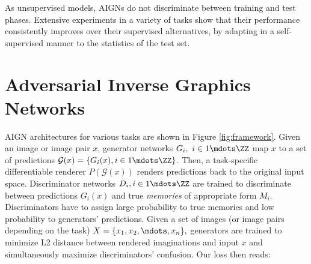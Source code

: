\documentclass[10pt,twocolumn,letterpaper]{article}
\begin{document}
\begin{bibunit}[ieee]
\begin{comment}

We test our AIGN model in the following tasks: (a) 3D human pose estimation from a single image, where it outperforms both a supervised model and the 3D interpreter model of  \cite{Wu2016} (which does not have adversarial priors). (b) Learning egomotion and 3D depth given a pair of frames (\ie, structure from motion), where it outperforms the geometric baseline of Jaegle \etal \cite{DBLP:conf/icra/JaeglePD16} in the synthetic Virtual KITTI dataset \cite{Gaidon:Virtual:CVPR2016} and handles  the well-known scale ambiguity of monocular 3D reconstruction, in which inverse rendering alone is susceptible to. %
(c) Super-resolution and inpainting, where it generates  effective gender and age transformations, and identity mixing, and outperform the work of Attribute2image  \cite{DBLP:journals/corr/YanYSL15}. 
\end{comment}

As unsupervised models, AIGNs do not discriminate between training and test phases. %
Extensive experiments in a variety of tasks show that their performance consistently improves over their supervised alternatives, by adapting in a self-supervised manner to the statistics of the test set.

\section{Adversarial Inverse Graphics Networks}AIGN architectures for various tasks 
are shown in Figure \ref{fig:framework}. 
Given an image or image pair $x$, 
 generator networks $G_i, \ i \in 1 \mdots \ZZ$ map $x$ to  a set of predictions  $ \mathcal{G}(x) = \{G_i(x), i \in 1 \mdots \ZZ \}$. 
 Then, a task-specific differentiable renderer $P(\mathcal{G}(x))$ renders predictions  back to the original input space.  Discriminator networks $\D_i, i \in 1 \mdots \ZZ$ are trained to discriminate between predictions $G_i(x)$ and  true \textit{memories} of appropriate form $M_i$. 
 Discriminators have to assign large probability to  true memories  and low probability to generators' predictions. 
 Given a set of images (or image pairs depending on the task) $X = \{x_1, x_2, \mdots, x_n\},$ 
 generators are trained to minimize L2 distance between rendered imaginations and input $x$ and simultaneously maximize discriminators' confusion. %
Our loss  then reads:


\end{bibunit}
\end{document}
